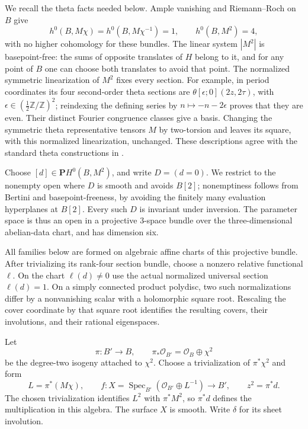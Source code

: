 \documentclass[11pt]{amsart}
\newcommand{\Z}{\mathbb Z}
\newcommand{\PP}{\mathbf P}
\theoremstyle{definition}
\theoremstyle{remark}
\numberwithin{equation}{section}
\begin{document}
We recall the theta facts needed below.  Ample vanishing and
Riemann--Roch on $B$ give
\[
 h^0(B,M\chi)=h^0(B,M\chi^{-1})=1,\qquad h^0(B,M^2)=4,
\]
with no higher cohomology for these bundles.  The linear system $|M^2|$
is basepoint-free: the sums of opposite translates of $H$ belong to it,
and for any point of $B$ one can choose both translates to avoid that
point.  The normalized symmetric linearization of $M^2$ fixes every
section.  For example, in period coordinates its four second-order
theta sections are
$\theta[\epsilon;0](2z,2\tau)$, with
$\epsilon\in(\tfrac12\Z/\Z)^2$; reindexing the defining series by
$n\mapsto-n-2\epsilon$ proves that they are even.  Their distinct Fourier
congruence classes give a basis.  Changing the symmetric theta
representative tensors $M$ by two-torsion and leaves its square, with
this normalized linearization, unchanged.  These descriptions agree
with the standard theta constructions in
\cite{MumfordTheta,BirkenhakeLange}.

Choose $[d]\in\PP H^0(B,M^2)$, and write $D=(d=0)$.  We restrict to the
nonempty open where $D$ is smooth and avoids $B[2]$; nonemptiness follows
from Bertini and basepoint-freeness, by avoiding the finitely many
evaluation hyperplanes at $B[2]$.  Every such $D$ is invariant under
inversion.  The parameter space is thus an open in a projective
$3$-space bundle over the three-dimensional abelian-data chart, and has
dimension six.

All families below are formed on algebraic affine charts of this
projective bundle.\label{geom:section-charts}
After trivializing its rank-four section bundle, choose a nonzero
relative functional $\ell$.  On the chart $\ell(d)\ne0$ use the
actual normalized universal section $\ell(d)=1$.  On a simply
connected product polydisc, two such normalizations differ by a
nonvanishing scalar with a holomorphic square root.  Rescaling the
cover coordinate by that square root identifies the resulting covers,
their involutions, and their rational eigenspaces.

Let
\[
 \pi:B'\longrightarrow B,\qquad
 \pi_*\mathcal O_{B'}=\mathcal O_B\oplus\chi^2
\]
be the degree-two isogeny attached to $\chi^2$.  Choose a trivialization
of $\pi^*\chi^2$ and form
\begin{equation}\label{geom:double-cover}
 L=\pi^*(M\chi),\qquad
 f:X=\operatorname{Spec}_{B'}(\mathcal O_{B'}\oplus L^{-1})
       \longrightarrow B',\qquad z^2=\pi^*d.
\end{equation}
The chosen trivialization identifies $L^2$ with $\pi^*M^2$, so
$\pi^*d$ defines the multiplication in this algebra.  The surface $X$
is smooth.  Write $\delta$ for its sheet involution.
\end{document}
